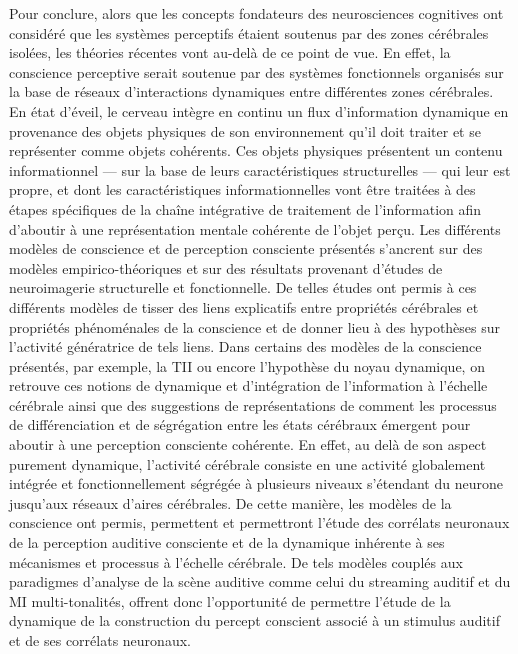 Pour conclure, alors que les concepts fondateurs des neurosciences cognitives ont considéré que les systèmes perceptifs étaient soutenus par des zones cérébrales isolées, les théories récentes vont au-delà de ce point de vue. 
En effet, la conscience perceptive serait soutenue par des systèmes fonctionnels organisés sur la base de réseaux d'interactions dynamiques entre différentes zones cérébrales. 
En état d'éveil, le cerveau intègre en continu un flux d'information dynamique en provenance des objets physiques de son environnement qu'il doit traiter et se représenter comme objets cohérents. 
Ces objets physiques présentent un contenu informationnel --- sur la base de leurs caractéristiques structurelles --- qui leur est propre, et dont les caractéristiques informationnelles vont être traitées à des étapes spécifiques de la chaîne intégrative de traitement de l'information afin d'aboutir à une représentation mentale cohérente de l'objet perçu. 
Les différents modèles de conscience et de perception consciente présentés s'ancrent sur des modèles empirico-théoriques et sur des résultats provenant d'études de neuroimagerie structurelle et fonctionnelle. 
De telles études ont permis à ces différents modèles de tisser des liens explicatifs entre propriétés cérébrales et propriétés phénoménales de la conscience et de donner lieu à des hypothèses sur l'activité génératrice de tels liens. 
Dans certains des modèles de la conscience présentés, par exemple, la TII ou encore l'hypothèse du noyau dynamique, on retrouve ces notions de dynamique et d'intégration de l'information à l'échelle cérébrale ainsi que des suggestions de représentations de comment les processus de différenciation et de ségrégation entre les états cérébraux émergent pour aboutir à une perception consciente cohérente. 
En effet, au delà de son aspect purement dynamique, l'activité cérébrale consiste en une activité globalement intégrée et fonctionnellement ségrégée à plusieurs niveaux s'étendant du neurone jusqu'aux réseaux d'aires cérébrales. 
De cette manière, les modèles de la conscience ont permis, permettent et permettront l'étude des corrélats neuronaux de la perception auditive consciente et de la dynamique inhérente à ses mécanismes et processus à l'échelle cérébrale. 
De tels modèles couplés aux paradigmes d'analyse de la scène auditive comme celui du streaming auditif et du MI multi-tonalités, offrent donc l'opportunité de permettre l'étude de la dynamique de la construction du percept conscient associé à un stimulus auditif et de ses corrélats neuronaux. 

